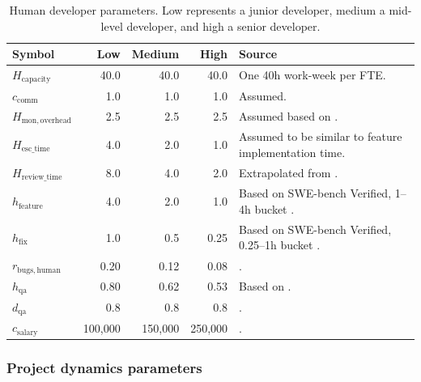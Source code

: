 \documentclass[smallextended]{svjour3}       %
\begin{document}
\begin{table}[t]
\caption{Human developer parameters. Low represents a junior developer, medium a mid-level developer, and high a senior developer.}
\label{tab:scenario:human}
\footnotesize
\begin{tabularx}{\linewidth}{p{1.8cm}rrrX}
\toprule
Symbol & Low & Medium & High & Source \\
\midrule
$H_\mathrm{capacity}$         & 40.0 & 40.0 & 40.0 & One 40h work-week per FTE. \\[2pt]
$c_\mathrm{comm}$             & 1.0  & 1.0  & 1.0  & Assumed. \\[2pt]
$H_\mathrm{mon,overhead}$     & 2.5  & 2.5  & 2.5  & Assumed based on \cite{baumann2026swechat}. \\[2pt]
$H_\mathrm{esc\_time}$        & 4.0  & 2.0  & 1.0  & Assumed to be similar to feature implementation time. \\[2pt]
$H_\mathrm{review\_time}$     & 8.0  & 4.0  & 2.0  & Extrapolated from \cite{amazonArchitecturalDecision}. \\[2pt]
$h_\mathrm{feature}$          & 4.0  & 2.0  & 1.0  & Based on SWE-bench Verified, 1--4h bucket \citep{openai2026swebenchverified,kwa2026measuringaiabilitycomplete}. \\[2pt]
$h_\mathrm{fix}$              & 1.0 & 0.5 & 0.25 & Based on SWE-bench Verified, 0.25--1h bucket \citep{openai2026swebenchverified,kwa2026measuringaiabilitycomplete}. \\[2pt]
$r_\mathrm{bugs,human}$   & 0.20 & 0.12 & 0.08 & \cite{coderabbit2025aicode}. \\
$h_\mathrm{qa}$ & 0.80 & 0.62 & 0.53 & Based on \cite{cohen2006best}. \\
$d_\mathrm{qa}$               & 0.8 & 0.8 & 0.8 & \cite{cohen2006best}. \\
$c_\mathrm{salary}$ & 100{,}000 & 150{,}000 & 250{,}000 & \cite{indeed2026salaries}. \\
\bottomrule
\end{tabularx}
\end{table}

\subsubsection{Project dynamics parameters}
\end{document}
